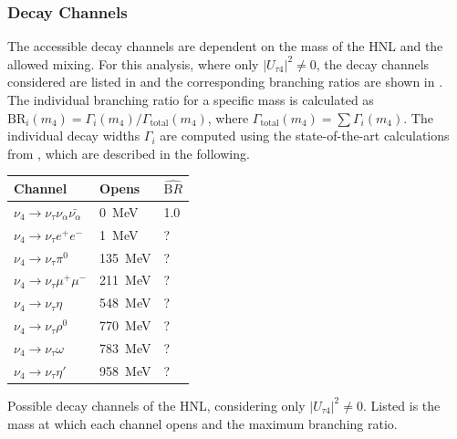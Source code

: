 \subsubsection{Decay Channels} 

The accessible decay channels are dependent on the mass of the HNL and the allowed mixing. For this analysis, where only $|U_{\tau4}|^2 \neq 0$, the decay channels considered are listed in  and the corresponding branching ratios are shown in . The individual branching ratio for a specific mass is calculated as $\mathrm{BR}_i(m_4)=\Gamma_i(m_4)/\Gamma_\mathrm{total}(m_4)$, where $\Gamma_\mathrm{total}(m_4)=\sum\Gamma_i(m_4)$.
The individual decay widths $\Gamma_i$ are computed using the state-of-the-art calculations from , which are described in the following.

\begin{margintable}
    \footnotesize
    \begin{tabular} { lll }
        \hline\hline 
        \textbf{Channel} & \textbf{Opens} & \textbf{$\hat{\mathrm BR}$} \\
        \hline\hline 
        $\nu_4 \rightarrow \nu_\tau \nu_\alpha \bar{\nu_\alpha}$ & \SI{0}{\MeV} & 1.0 \\
        $\nu_4 \rightarrow \nu_\tau e^+ e^-$ & \SI{1}{\MeV} & ? \\
        $\nu_4 \rightarrow \nu_\tau \pi^0$ & \SI{135}{\MeV} & ? \\
        $\nu_4 \rightarrow \nu_\tau \mu^+ \mu^-$ & \SI{211}{\MeV} & ? \\
        $\nu_4 \rightarrow \nu_\tau \eta$ & \SI{548}{\MeV} & ? \\
        $\nu_4 \rightarrow \nu_\tau \rho^0$ & \SI{770}{\MeV} & ? \\
        $\nu_4 \rightarrow \nu_\tau \omega$ & \SI{783}{\MeV} & ? \\
        $\nu_4 \rightarrow \nu_\tau \eta'$ & \SI{958}{\MeV} & ? \\
        \hline
    \end{tabular}
    \caption[HNL mass dependent decay channels]{Possible decay channels of the HNL, considering only $|U_{\tau4}|^2 \neq 0$. Listed is the mass at which each channel opens and the maximum branching ratio.}
\end{margintable}


